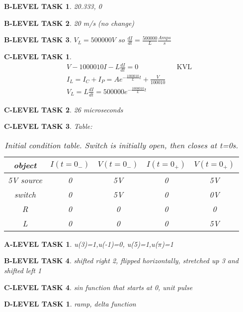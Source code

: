 \documentclass{book}
\numberwithin{equation}{section}
\newtheorem{alevel}{A-LEVEL TASK}
\newtheorem{blevel}{B-LEVEL TASK}
\newtheorem{clevel}{C-LEVEL TASK}
\newtheorem{dlevel}{D-LEVEL TASK}
\theoremstyle{definition}
\begin{document}
\begin{blevel}20.333, 0\end{blevel}
\begin{blevel}20 m/s (no change)\end{blevel}
\begin{blevel}$V_L=500000V$ so $\frac{dI}{dt}=\frac{500000}{L} \frac{Amps}{s}$\end{blevel}
\begin{clevel}
\begin{align*}
V-1000010I-L\frac{dI}{dt}=0&&\text{KVL}\\
I_L=I_C+I_P=Ae^{-\frac{1000010}{L}t}+\frac{V}{100010}\\
V_L=L\frac{dI}{dt}=500000e^{-\frac{1000010}{L}t}
\end{align*}
\end{clevel}
\begin{clevel}26 microseconds\end{clevel}

\begin{clevel}Table:\par
\begin{table}[H]
\begin{center}
\begin{tabular}{|c|c|c|c|c|} \hline
object	&$I(t=0_{-})$	&$V(t=0_{-})$	&$I(t=0_{+})$	&$V(t=0_{+})$ \\ \hline
5V source&0&5V&0&5V \\ \hline
switch&0&5V&0&0V \\ \hline
R&0&0&0&0 \\ \hline
L&0&0&0&5V \\ \hline
\end{tabular}
\caption{Initial condition table. Switch is initially open, then closes at t=0s.}
\label{T:6ICP}
\end{center}
\end{table}
\end{clevel}

\begin{alevel}u(3)=1,u(-1)=0, u(5)=1,u($\pi$)=1\end{alevel}
\begin{blevel}shifted right 2, flipped horizontally, stretched up 3 and shifted left 1\end{blevel}
\begin{clevel}sin function that starts at 0, unit pulse\end{clevel}
\begin{dlevel}ramp, delta function\end{dlevel}
\end{document}
